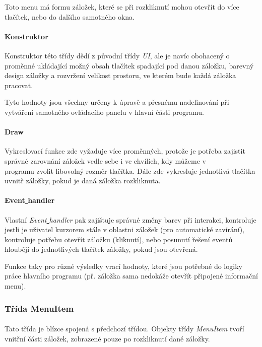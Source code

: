 \documentclass[a4paper, 12pt]{article}
\begin{document}
Toto menu má formu záložek, které se při rozkliknutí mohou otevřít do více
tlačítek, nebo do dalšího samotného okna.

\paragraph{Konstruktor}
Konstruktor této třídy dědí z původní třídy \emph{UI}, ale je navíc obohacený o
proměnné ukládající možný obsah tlačítek spadající pod danou záložku, barevný
design záložky a rozvržení velikost prostoru, ve kterém bude každá záložka pracovat.

Tyto hodnoty jsou všechny určeny k úpravě a přesnému nadefinování při vytváření
samotného ovládacího panelu v hlavní části programu.

\paragraph{Draw}
Vykreslovací funkce zde vyžaduje více proměnných, protože je potřeba zajistit
správné zarovnání záložek vedle sebe i ve chvílích, kdy můžeme v \\programu
zvolit libovolný rozměr tlačítka. Dále zde vykresluje jednotlivá tlačítka
uvnitř záložky, pokud je daná záložka rozkliknuta.

\paragraph{Event\underline{ }handler}
Vlastní \emph{Event\underline{ }handler} pak zajištuje správné změny barev při
interakci, kontroluje jestli je uživatel kurzorem stále v oblastni záložek
(pro automatické zavírání), kontroluje potřebu otevřít záložku (kliknutí), nebo
posunutí řešení eventů hlouběji do jednotlivých tlačítek záložky, pokud jsou
otevřená.

Funkce taky pro různé výsledky vrací hodnoty, které jsou potřebné do logiky
práce hlavního programu (př. záložka sama nedokáže otevřít připojené informační
menu).
\\
\subsubsection{Třída MenuItem}
\paragraph{}
Tato třída je blízce spojená s předchozí třídou. Objekty třídy \emph{MenuItem}
tvoří vnitřní části záložek, zobrazené pouze po rozkliknutí dané záložky.
\end{document}
